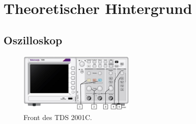 \section{Theoretischer Hintergrund}

\subsection{Oszilloskop}

\begin{figure}[hb]
	\centering
		\includegraphics[width=0.5\textwidth]{Versuch_15-16/Abbildungen/TDS2000.JPG}
	\caption{Front des TDS 2001C.}
	\label{fig:TDS2000}
\end{figure}

